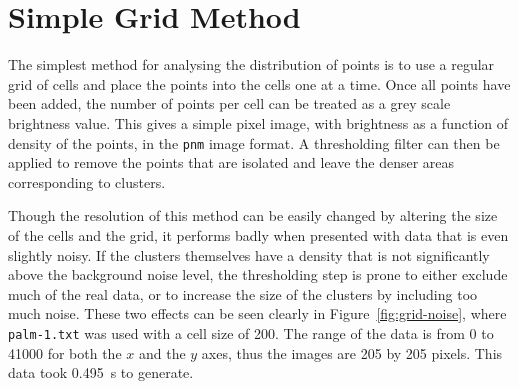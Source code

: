 
\section{Simple Grid Method}
\label{sec:simple_grid_method}

The simplest method for analysing the distribution of points is to use a
regular grid of cells and place the points into the cells one at a time. Once
all points have been added, the number of points per cell can be treated as a
grey scale brightness value. This gives a simple pixel image, with brightness
as a function of density of the points, in the \texttt{pnm} image format. A
thresholding filter can then be applied to remove the points that are isolated
and leave the denser areas corresponding to clusters.

Though the resolution of this method can be easily changed by altering the size
of the cells and the grid, it performs badly when presented with data that is
even slightly noisy. If the clusters themselves have a density that is not
significantly above the background noise level, the thresholding step is prone
to either exclude much of the real data, or to increase the size of the
clusters by including too much noise. These two effects can be seen clearly in
Figure~\ref{fig:grid-noise}, where \texttt{palm-1.txt} was used with a cell
size of 200. The range of the data is from 0 to 41000 for both the $x$ and the
$y$ axes, thus the images are 205 by 205 pixels. This data took
\SI{0.495}{\second} to generate.

